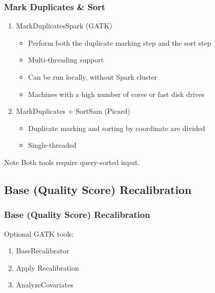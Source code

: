 \documentclass{beamer}
\begin{document}
\begin{frame}
\frametitle{Mark Duplicates \& Sort}

\begin{enumerate}
\item MarkDuplicatesSpark (GATK)
\begin{itemize}
\item Perform both the duplicate marking step and the sort step
\item Multi-threading support
\item Can be run locally, without Spark cluster
\item Machines with a high number of cores or fast disk drives
\end{itemize}
\item MarkDuplicates + SortSam (Picard)
\begin{itemize}
\item Duplicate marking and sorting by coordinate are divided
\item Single-threaded
\end{itemize}
\end{enumerate}

\begin{block}{Note}
Both tools require query-sorted input. 
\end{block}

\end{frame}

\subsection{Base (Quality Score) Recalibration}

\begin{frame}
\frametitle{Base (Quality Score) Recalibration}

Optional GATK tools:

\begin{enumerate}
\item BaseRecalibrator
\item Apply Recalibration
\item AnalyzeCovariates
\end{enumerate}

\end{frame}
\end{document}
